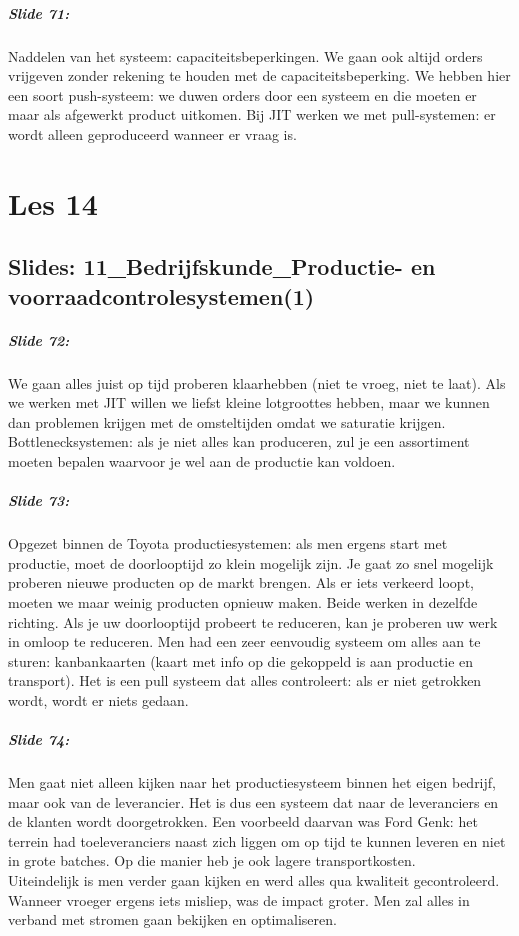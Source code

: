 \documentclass[10pt,a4paper]{report}
\begin{document}
\paragraph{Slide 71:} Naddelen van het systeem: capaciteitsbeperkingen. We gaan ook altijd orders vrijgeven zonder rekening te houden met de capaciteitsbeperking. We hebben hier een soort push-systeem: we duwen orders door een systeem en die moeten er maar als afgewerkt product uitkomen. Bij JIT werken we met pull-systemen: er wordt alleen geproduceerd wanneer er vraag is. 

\chapter{Les 14}
\section{Slides: 11\_Bedrijfskunde\_Productie- en voorraadcontrolesystemen(1)}

\paragraph{Slide 72:} We gaan alles juist op tijd proberen klaarhebben (niet te vroeg, niet te laat). Als we werken met JIT willen we liefst kleine lotgroottes hebben, maar we kunnen dan problemen krijgen met de omsteltijden omdat we saturatie krijgen.\\
Bottlenecksystemen: als je niet alles kan produceren, zul je een assortiment moeten bepalen waarvoor je wel aan de productie kan voldoen.

\paragraph{Slide 73:} Opgezet binnen de Toyota productiesystemen: als men ergens start met productie, moet de doorlooptijd zo klein mogelijk zijn. Je gaat zo snel mogelijk proberen nieuwe producten op de markt brengen. Als er iets verkeerd loopt, moeten we maar weinig producten opnieuw maken. Beide werken in dezelfde richting. Als je uw doorlooptijd probeert te reduceren, kan je proberen uw werk in omloop te reduceren. Men had een zeer eenvoudig systeem om alles aan te sturen: kanbankaarten (kaart met info op die gekoppeld is aan productie en transport). Het is een pull systeem dat alles controleert: als er niet getrokken wordt, wordt er niets gedaan. 

\paragraph{Slide 74:} Men gaat niet alleen kijken naar het productiesysteem binnen het eigen bedrijf, maar ook van de leverancier. Het is dus een systeem dat naar de leveranciers en de klanten wordt doorgetrokken. Een voorbeeld daarvan was Ford Genk: het terrein had toeleveranciers naast zich liggen om op tijd te kunnen leveren en niet in grote batches. Op die manier heb je ook lagere transportkosten. \\
Uiteindelijk is men verder gaan kijken en werd alles qua kwaliteit gecontroleerd. Wanneer vroeger ergens iets misliep, was de impact groter. Men zal alles in verband met stromen gaan bekijken en optimaliseren.
\end{document}
